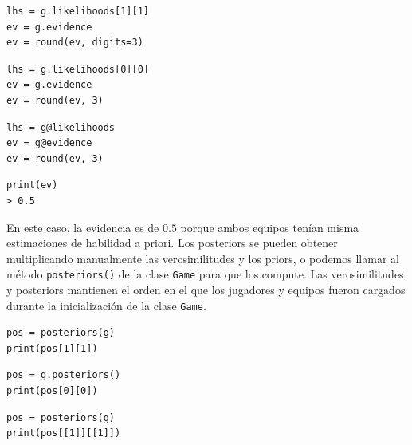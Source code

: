 \documentclass[a4paper,11pt]{book}
\theoremstyle{definition}
\newif\ifen
\newcommand{\en}[1]{\ifen#1\fi}
\begin{document}
%
\begin{paracol}{3}
\begin{lstlisting}[backgroundcolor=\color{julia!60},belowskip=0cm]
lhs = g.likelihoods[1][1]
ev = g.evidence
ev = round(ev, digits=3)
\end{lstlisting}
  \switchcolumn
\begin{lstlisting}[backgroundcolor=\color{python!60},belowskip=0cm]
lhs = g.likelihoods[0][0]
ev = g.evidence
ev = round(ev, 3)
\end{lstlisting}
   \switchcolumn
\begin{lstlisting}[backgroundcolor=\color{r!50},belowskip=0cm]
lhs = g@likelihoods
ev = g@evidence
ev = round(ev, 3)
\end{lstlisting}
\end{paracol}
\begin{lstlisting}[captionpos=b,backgroundcolor=\color{all},label=lst:evidence_likelihoods,caption={Consulta de la evidencia y las verosimilitudes},aboveskip=0cm,belowskip=0cm]
print(ev)
> 0.5
\end{lstlisting}
%
En este caso, la evidencia es de $0.5$ porque ambos equipos tenían misma estimaciones de habilidad a priori.
%
Los posteriors se pueden obtener multiplicando manualmente las verosimilitudes y los priors, o podemos llamar al método \texttt{posteriors()} de la clase \texttt{Game} para que los compute.
%
Las verosimilitudes y posteriors mantienen el orden en el que los jugadores y equipos fueron cargados durante la inicialización de la clase \texttt{Game}.
%
\begin{paracol}{3}
\begin{lstlisting}[backgroundcolor=\color{julia!60}, belowskip=-0.77 \baselineskip]
pos = posteriors(g)
print(pos[1][1])
\end{lstlisting}
  \switchcolumn
\begin{lstlisting}[backgroundcolor=\color{python!60}, belowskip=-0.77 \baselineskip]
pos = g.posteriors()
print(pos[0][0])
\end{lstlisting}
   \switchcolumn
\begin{lstlisting}[backgroundcolor=\color{r!50}, belowskip=-0.77 \baselineskip]
pos = posteriors(g)
print(pos[[1]][[1]])
\end{lstlisting}
\end{paracol}
\end{document}
